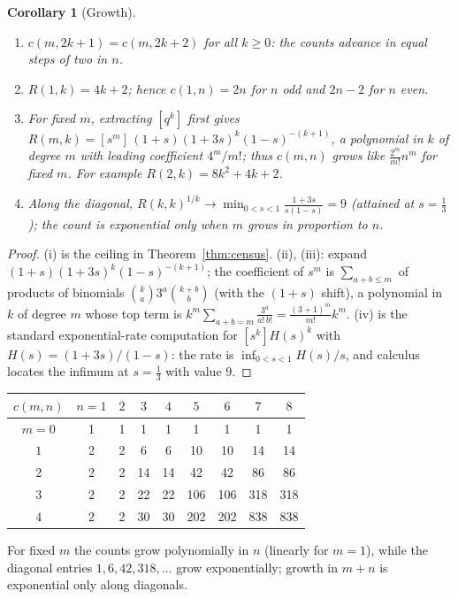 \documentclass[11pt]{article}
\newtheorem{corollary}[theorem]{Corollary}
\theoremstyle{definition}
\theoremstyle{remark}
\begin{document}
\begin{corollary}[Growth]\label{cor:growth}
\begin{enumerate}
\item[(i)] $c(m,2k+1)=c(m,2k+2)$ for all $k\ge0$: the counts advance in equal steps of two in $n$.
\item[(ii)] $R(1,k)=4k+2$; hence $c(1,n)=2n$ for $n$ odd and $2n-2$ for $n$ even.
\item[(iii)] For fixed $m$, extracting $[q^k]$ first gives $R(m,k)=[s^m]\,(1+s)(1+3s)^k(1-s)^{-(k+1)}$, a polynomial in $k$ of degree $m$ with leading coefficient $4^m/m!$; thus $c(m,n)$ grows like $\frac{2^m}{m!}n^m$ for fixed $m$. For example $R(2,k)=8k^2+4k+2$.
\item[(iv)] Along the diagonal, $R(k,k)^{1/k}\to\min_{0<s<1}\frac{1+3s}{s(1-s)}=9$ (attained at $s=\frac13$); the count is exponential only when $m$ grows in proportion to $n$.
\end{enumerate}
\end{corollary}

\begin{proof}
(i) is the ceiling in Theorem~\ref{thm:census}. (ii), (iii): expand $(1+s)(1+3s)^k(1-s)^{-(k+1)}$; the coefficient of $s^m$ is $\sum_{a+b\le m}$ of products of binomials $\binom ka3^a\binom{k+b}b$ (with the $(1+s)$ shift), a polynomial in $k$ of degree $m$ whose top term is $k^m\sum_{a+b=m}\frac{3^a}{a!\,b!}=\frac{(3+1)^m}{m!}k^m$. (iv) is the standard exponential-rate computation for $[s^k]H(s)^k$ with $H(s)=(1+3s)/(1-s)$: the rate is $\inf_{0<s<1}H(s)/s$, and calculus locates the infimum at $s=\frac13$ with value $9$.
\end{proof}

\begin{center}
\begin{tabular}{c|cccccccc}
$c(m,n)$ & $n{=}1$ & $2$ & $3$ & $4$ & $5$ & $6$ & $7$ & $8$\\
\hline
$m{=}0$ & 1 & 1 & 1 & 1 & 1 & 1 & 1 & 1\\
$1$ & 2 & 2 & 6 & 6 & 10 & 10 & 14 & 14\\
$2$ & 2 & 2 & 14 & 14 & 42 & 42 & 86 & 86\\
$3$ & 2 & 2 & 22 & 22 & 106 & 106 & 318 & 318\\
$4$ & 2 & 2 & 30 & 30 & 202 & 202 & 838 & 838
\end{tabular}
\end{center}

\smallskip
For fixed $m$ the counts grow polynomially in $n$ (linearly for $m=1$), while the diagonal entries $1, 6, 42, 318,\dots$ grow exponentially; growth in $m+n$ is exponential only along diagonals.
\end{document}
